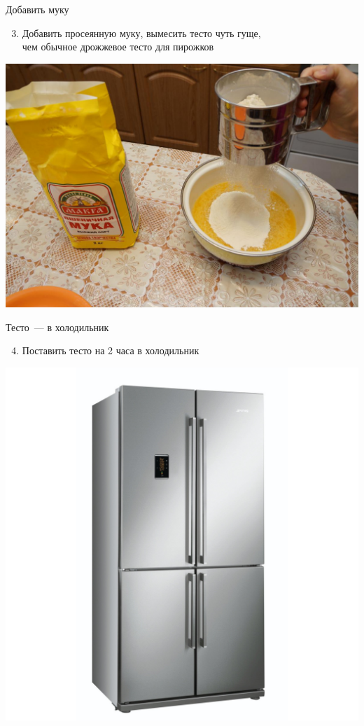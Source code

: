 \documentclass[usenames,dvipsnames,pdftex,unicode,hidelinks]{beamer}
\newcommand{\operation}[2]{
    \begin{enumerate}
        \setcounter{enumi}{#1}
      \item #2
    \end{enumerate}
  }
\begin{document}
  \begin{frame}{Добавить муку}
    \begin{center}
      \operation{2}{Добавить просеянную муку, вымесить тесто чуть гуще,\\
        чем обычное дрожжевое тесто для пирожков}

      \includegraphics[height=0.65\textheight]{flour}
    \end{center}
  \end{frame}

  \begin{frame}{Тесто~--- в холодильник}
    \begin{center}
      \operation{3}{Поставить тесто на 2 часа в холодильник}

      \includegraphics[height=0.7\textheight]{fridge}
    \end{center}
  \end{frame}
\end{document}
